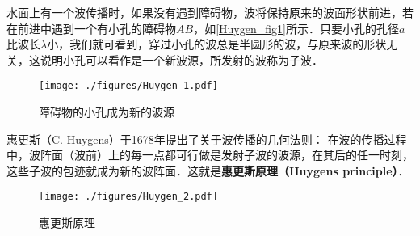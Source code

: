 
水面上有一个波传播时，如果没有遇到障碍物，波将保持原来的波面形状前进，若在前进中遇到一个有小孔的障碍物$AB$，如\autoref{Huygen_fig1}所示．只要小孔的孔径$a $比波长$\lambda$小，我们就可看到，穿过小孔的波总是半圆形的波，与原来波的形状无关，这说明小孔可以看作是一个新波源，所发射的波称为子波．

\begin{figure}[ht]
\centering
\texttt{[image: ./figures/Huygen\_1.pdf]}
\caption{障碍物的小孔成为新的波源} \label{Huygen_fig1}
\end{figure}

惠更斯（C. Huygens）于1678年提出了关于波传播的几何法则： 在波的传播过程中，波阵面（波前）上的每一点都可行做是发射子波的波源，在其后的任一时刻，这些子波的包迹就成为新的波阵面．这就是\textbf{惠更斯原理（Huygens principle）}．
\begin{figure}[ht]
\centering
\texttt{[image: ./figures/Huygen\_2.pdf]}
\caption{惠更斯原理} \label{Huygen_fig2}
\end{figure}